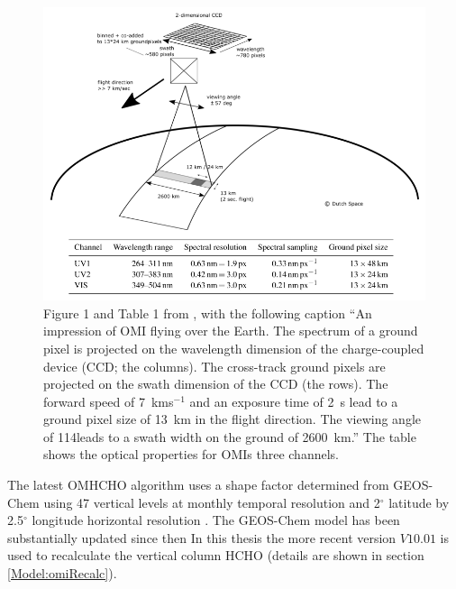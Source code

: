   \begin{figure}
    \includegraphics[width=\textwidth]{Figures/Shenkeveld_OMI_summary.png}
    \caption{ %
      Figure 1 and Table 1 from \textcite{Schenkeveld2017}, with the following caption ``An impression of OMI flying over the Earth.
      The spectrum of a ground pixel is projected on the wavelength dimension of the charge-coupled device (CCD; the columns). 
      The cross-track ground pixels are projected on the swath dimension of the CCD (the rows).
      The forward speed of 7~kms$^{-1}$ and an exposure time of 2~s lead to a ground pixel size of 13~km in the flight direction.
      The viewing angle of 114\degr leads to a swath width on the ground of 2600~km.''
      The table shows the optical properties for OMIs three channels.}
    \label{LR:HCHO:Sat:fig_Shenkeveld_OMI_summary}
  \end{figure}
  
  The latest OMHCHO algorithm uses a shape factor determined from GEOS-Chem using 47 vertical levels at monthly temporal resolution and 2$^{\circ}$ latitude by 2.5$^{\circ}$ longitude horizontal resolution \parencite{Abad2015}.
  The GEOS-Chem model has been substantially updated since then
  In this thesis the more recent version $V10.01$ is used to recalculate the vertical column HCHO (details are shown in section \ref{Model:omiRecalc}).
  
